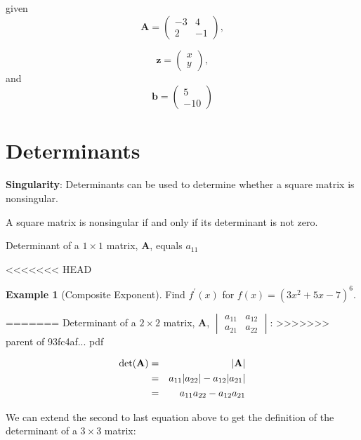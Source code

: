 \documentclass[]{book}
\theoremstyle{definition}
\theoremstyle{definition}
\newtheorem{example}{Example}[chapter]
\theoremstyle{definition}
\theoremstyle{remark}
\begin{document}
given \[\textbf{A} = \begin{pmatrix} -3&4\\2&-1 \end{pmatrix},\]

\[\textbf{z} = \begin{pmatrix} x\\y \end{pmatrix},\]
and
\[\textbf{b} = \begin{pmatrix} 5\\-10 \end{pmatrix}\]

\hypertarget{determinants}{%
\section{Determinants}\label{determinants}}

\textbf{Singularity}: Determinants can be used to determine whether a square matrix is nonsingular.

A square matrix is nonsingular if and only if its determinant is not zero.

Determinant of a \(1 \times 1\) matrix, \textbf{A}, equals \(a_{11}\)

<<<<<<< HEAD
\begin{example}[Composite Exponent]
\protect\hypertarget{exm:tothesix}{}{\label{exm:tothesix} {} }Find \(f^\prime(x)\) for \(f(x) = (3x^2+5x-7)^6\).
\end{example}
=======
Determinant of a \(2 \times 2\) matrix, \textbf{A},
\(\begin{vmatrix} a_{11}&a_{12}\\  a_{21}&a_{22} \end{vmatrix}\):
>>>>>>> parent of 93fc4af... pdf

\begin{eqnarray*}
\det({\bf A}) &=& |{\bf A}|\\
            &=& a_{11}|a_{22}| - a_{12}|a_{21}|\\
            &=& a_{11}a_{22} - a_{12}a_{21}
\end{eqnarray*}

We can extend the second to last equation above to get the definition of the determinant of a \(3 \times 3\) matrix:
\end{document}
